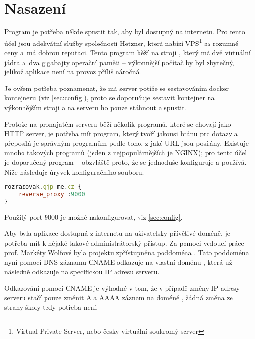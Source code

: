 \hypertarget{Technologie}{\chapter{Nasazení}}

\indent

Program je potřeba někde spustit tak, aby byl dostupný na internetu. Pro tento účel jsou adekvátní služby společnosti Hetzner, která nabízí VPS\footnote{Virtual Private Server, nebo česky virtuální soukromý server} za rozumné ceny a~má dobrou reputaci. Tento program běží na stroji , který má dvě virtuální jádra a~dva gigabajty operační paměti -- výkonnější počítač by byl zbytečný, jelikož aplikace není na provoz příliš náročná.

Je ovšem potřeba poznamenat, že má server potíže se sestavováním docker kontejneru (viz \ref{sec:config}), proto se doporučuje sestavit kontejner na výkonnějším stroji a na serveru ho pouze stáhnout a spustit. 

Protože na pronajatém serveru běží několik programů, které se chovají jako HTTP server, je potřeba mít program, který tvoří jakousi bránu pro dotazy a přeposílá je správným programům podle toho, z jaké URL jsou posílány. Existuje mnoho takových programů (jeden z nejpopulárnějších je NGINX); pro tento účel je doporučený program  -- obzvláště proto, že se jednoduše konfiguruje a používá. Níže následuje úryvek konfiguračního souboru. 

\begin{lstlisting}[language=JavaScript,caption={Úryvek konfiguračního souboru Caddy}]
rozrazovak.gjp-me.cz {
    reverse_proxy :9000
}
\end{lstlisting}

Použitý port 9000 je možné nakonfigurovat, viz \ref{sec:config}.

Aby byla aplikace dostupná z internetu na uživatelsky přívětivé doméně, je potřeba mít k nějaké takové administrátorský přístup. Za pomoci vedoucí práce prof. Markéty Wolfové byla projektu zpřístupněna poddoména . Tato poddoména nyní pomocí DNS záznamu CNAME odkazuje na vlastní doménu , která už následně odkazuje na specifickou IP adresu serveru. 

Odkazování pomocí CNAME je výhodné v tom, že v případě změny IP adresy serveru stačí pouze změnit A a AAAA záznam na doméně , žádná změna ze strany školy tedy potřeba není.

\newpage

